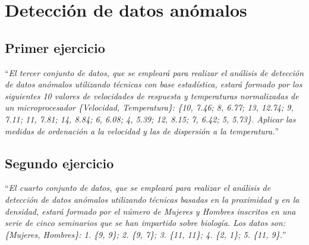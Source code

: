 \documentclass[12pt]{report}\usepackage[]{graphicx}\usepackage[dvipsnames]{xcolor}
\begin{document}
		\section{Detección de datos anómalos}
		
			\subsection{Primer ejercicio}
			
				``\textit{El tercer conjunto de datos, que se empleará para realizar el análisis de detección de datos anómalos utilizando técnicas con base estadística, estará formado por los siguientes 10 valores de velocidades de respuesta y temperaturas normalizadas de un microprocesador \{Velocidad, Temperatura\}: \{10, 7.46; 8, 6.77; 13, 12.74; 9, 7.11; 11, 7.81; 14, 8.84; 6, 6.08; 4, 5.39; 12, 8.15; 7, 6.42; 5, 5.73\}. Aplicar las medidas de ordenación a la velocidad y las de dispersión a la temperatura.}''
			
			\subsection{Segundo ejercicio}
			
				``\textit{El cuarto conjunto de datos, que se empleará para realizar el análisis de detección de datos anómalos utilizando técnicas basadas en la proximidad y en la densidad, estará formado por el número de Mujeres y Hombres inscritos en una serie de cinco seminarios que se han impartido sobre biología. Los datos son: \{Mujeres, Hombres\}: 1. \{9, 9\}; 2. \{9, 7\}; 3. \{11, 11\}; 4. \{2, 1\}; 5. \{11, 9\}.}''
	
\end{document}

